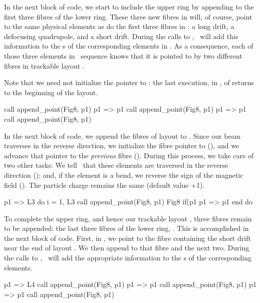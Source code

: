 %
In the next block of code, we start to include the upper ring by
appending to  the first three fibres of the lower ring.
These three new fibres in  will, of course, point to the
same physical elements as do the first three fibres in :
a long drift, a defocusing quadrupole, and a short drift. During
the calls to , \PTC\ will add this information
to the s of the corresponding elements in . As a
consequence, each of those three elements in \DNA\ sequence 
knows that it is pointed to by two different fibres in trackable
layout .%



Note that we need not initialize the pointer  to : the last execution, in , of  returns  to the beginning of the layout.
%
\begin{ptccode}
call append_point(Fig8, p1)
p1 => p1%
call append_point(Fig8, p1)
p1 => p1%
call append_point(Fig8, p1)
\end{ptccode}

In the next block of code, we append the fibres of layout 
to . Since our beam traverses  in the reverse
direction, we initialize the fibre pointer  to 
(), and we advance that pointer to the
\emph{previous} fibre (). During this process,
we take care of two other tasks: We tell \PTC\ that these elements
are traversed in the reverse direction (); and,
if the element is a bend, we reverse the sign of the magnetic field
(). The particle charge remains the same (default
value +1).
%
\begin{ptccode}
p1 => L3%
do i = 1, L3%
  call append_point(Fig8, p1)
  Fig8%
  if(p1%
  p1 => p1%
end do
\end{ptccode}

%
To complete the upper ring, and hence our trackable layout
, three fibres remain to be appended: the last three
fibres of the lower ring, . This is accomplished in the
next block of code. First, in , we point
 to the fibre containing the short drift near the end of
layout . We then append to  that fibre and the
next two. During the calls to , \PTC\ will add
the appropriate information to the s of the corresponding
elements.
%
\begin{ptccode}
p1 => L4%
call append_point(Fig8, p1)
p1 => p1%
call append_point(Fig8, p1)
p1 => p1%
call append_point(Fig8, p1)
\end{ptccode}


